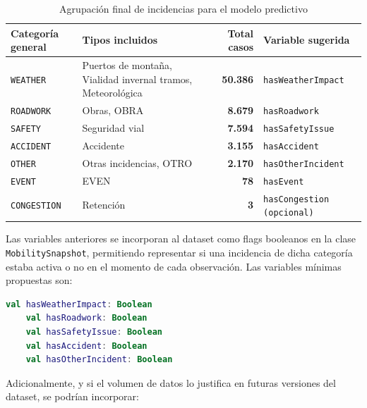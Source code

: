\begin{table}[H]
	\centering
	\caption{Agrupación final de incidencias para el modelo predictivo}
	\label{tab:agrupacion_incidencias}
	\begin{tabular}{|l|p{5.5cm}|r|l|}
		\hline
		\textbf{Categoría general} & \textbf{Tipos incluidos} & \textbf{Total casos} & \textbf{Variable sugerida} \\
		\hline
		\texttt{WEATHER}    & Puertos de montaña, Vialidad invernal tramos, Meteorológica & \textbf{50.386} & \texttt{hasWeatherImpact} \\
		\texttt{ROADWORK}   & Obras, OBRA                                                   & \textbf{8.679}  & \texttt{hasRoadwork} \\
		\texttt{SAFETY}     & Seguridad vial                                                & \textbf{7.594}  & \texttt{hasSafetyIssue} \\
		\texttt{ACCIDENT}   & Accidente                                                     & \textbf{3.155}  & \texttt{hasAccident} \\
		\texttt{OTHER}      & Otras incidencias, OTRO                                       & \textbf{2.170}  & \texttt{hasOtherIncident} \\
		\texttt{EVENT}      & EVEN                                                          & \textbf{78}     & \texttt{hasEvent} \\
		\texttt{CONGESTION} & Retención                                                     & \textbf{3}      & \texttt{hasCongestion (opcional)} \\
		\hline
	\end{tabular}
\end{table}

Las variables anteriores se incorporan al dataset como flags booleanos en la clase \texttt{MobilitySnapshot}, permitiendo representar si una incidencia de dicha categoría estaba activa o no en el momento de cada observación. Las variables mínimas propuestas son:

\begin{lstlisting}[language=Kotlin, caption={Variables mínimas de incidencias en MobilitySnapshot}]
	val hasWeatherImpact: Boolean
	val hasRoadwork: Boolean
	val hasSafetyIssue: Boolean
	val hasAccident: Boolean
	val hasOtherIncident: Boolean
\end{lstlisting}

Adicionalmente, y si el volumen de datos lo justifica en futuras versiones del dataset, se podrían incorporar:

